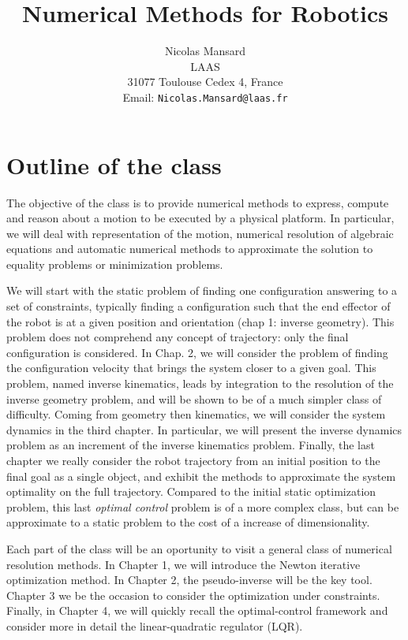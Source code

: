 \documentclass{book}
\title{Numerical Methods for Robotics}
\author{ 
  Nicolas Mansard\\
        LAAS\\
        31077 Toulouse Cedex 4, France\\
 { \footnotesize Email: {\tt Nicolas.Mansard@laas.fr} }
}
\date{}
\begin{document}
\maketitle

\tableofcontents

\chapter{Outline of the class}

The objective of the class is to provide numerical methods to express, compute and reason about a motion to be executed by a physical platform. In particular, we will deal with representation of the motion, numerical resolution of algebraic equations and automatic numerical methods to approximate the solution to equality problems or minimization problems.

We will start with the static problem of finding one configuration answering to a set of constraints, typically finding a configuration such that the end effector of the robot is at a given position and orientation (chap 1: inverse geometry). This problem does not comprehend any concept of trajectory: only the final configuration is considered. In Chap. 2, we will consider the problem of finding the configuration velocity that brings the system closer to a given goal. This problem, named inverse kinematics, leads by integration to the resolution of the inverse geometry problem, and will be shown to be of a much simpler class of difficulty. Coming from geometry then kinematics, we will consider the system dynamics in the third chapter. In particular, we will present the inverse dynamics problem as an increment of the inverse kinematics problem. Finally, the last chapter we really consider the robot trajectory from an initial position to the final goal as a single object, and exhibit the methods to approximate the system optimality on the full trajectory. Compared to the initial static optimization problem, this last \emph{optimal control} problem is of a more complex class, but can be approximate to a static problem to the cost of a increase of dimensionality.

Each part of the class will be an oportunity to visit a general class of numerical resolution methods. In Chapter 1, we will introduce the Newton iterative optimization method. In Chapter 2, the pseudo-inverse will be the key tool. Chapter 3 we be the occasion to consider the optimization under constraints. Finally, in Chapter 4, we will quickly recall the optimal-control framework and consider more in detail the linear-quadratic regulator (LQR). 
\end{document}
